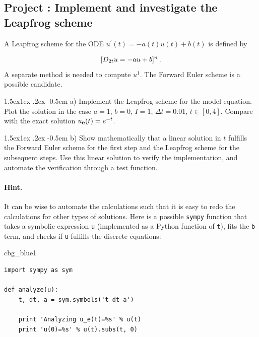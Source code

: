 \documentclass[%
oneside,                 %
final,                   %
10pt]{article}
\makeatletter
\newenvironment{_cod_tight}[1]{
   \def\FrameCommand{\colorbox{#1}}
   \FrameRule0.6pt\MakeFramed {\FrameRestore}\vskip3mm}
   {\vskip0mm\endMakeFramed}
\newenvironment{cod}[1]{
\bgroup\rmfamily
\fboxsep=0mm\relax
\begin{_cod_tight}{#1}
\list{}{\parsep=-2mm\parskip=0mm\topsep=0pt\leftmargin=2mm
\rightmargin=2\leftmargin\leftmargin=4pt\relax}
\item\relax}
{\endlist\end{_cod_tight}\egroup}
\newenvironment{doconceexercise}{}{}
\newcounter{doconceexercisecounter}
\newcommand\subex{\@startsection{paragraph}{4}{\z@}%
                  {1.5ex\@plus1ex \@minus.2ex}%
                  {-0.5em}%
                  {\normalfont\normalsize\bfseries}}
\makeatother
\begin{document}
\begin{doconceexercise}

\subsection*{Project \thedoconceexercisecounter: Implement and investigate the Leapfrog scheme}

\label{decay:fd2:exer:leapfrog1}

A Leapfrog scheme
for the ODE $u^{\prime}(t) = -a(t)u(t) + b(t)$ is defined by

\begin{equation}
\lbrack D_{2t}u = -au+b\rbrack^n\thinspace .
\label{decay:fd2:exer:leapfrog1:scheme}
\end{equation}
A separate method is needed to compute $u^1$. The Forward Euler
scheme is a possible candidate.


\subex{a)}
Implement the Leapfrog scheme for the model equation.
Plot the solution in the case $a=1$, $b=0$, $I=1$,
$\Delta t = 0.01$, $t\in [0,4]$. Compare with the exact
solution ${u_{\small\mbox{e}}}(t)=e^{-t}$.

\subex{b)}
Show mathematically that a linear solution in $t$ fulfills the
Forward Euler scheme for the first step and the Leapfrog scheme
for the subsequent steps. Use this linear solution to verify
the implementation, and automate the verification through a test
function.


\paragraph{Hint.}
It can be wise to automate the calculations such that it is easy to
redo the calculations for other types of solutions. Here is
a possible \texttt{sympy} function that takes a symbolic expression \texttt{u}
(implemented as a Python function of \texttt{t}), fits the \texttt{b} term, and
checks if \texttt{u} fulfills the discrete equations:

\begin{cod}{cbg_blue1}\begin{Verbatim}[numbers=none,fontsize=\fontsize{9pt}{9pt},baselinestretch=0.95,xleftmargin=2mm]
import sympy as sym

def analyze(u):
    t, dt, a = sym.symbols('t dt a')

    print 'Analyzing u_e(t)=%s' % u(t)
    print 'u(0)=%s' % u(t).subs(t, 0)


\end{Verbatim}
\end{cod}
\end{doconceexercise}
\end{document}
